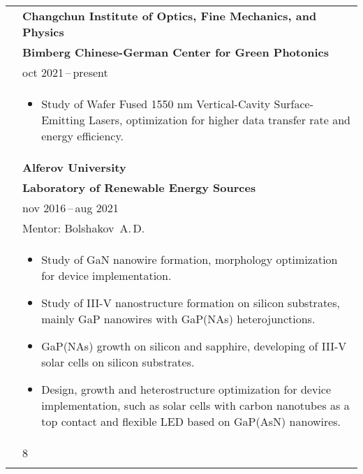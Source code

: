 \documentclass[letterpaper, 11pt]{article}
\begin{document}
\begin{longtable}{p{1.3in}p{4.8in}}
		
		\nohyphens{\color{OliveGreen}{Work experience}}
        & \textbf{Changchun Institute of Optics, Fine Mechanics, and Physics} \\
        & \textbf{Bimberg Chinese-German Center for Green Photonics} \\
		& \text{Postdoctoral researcher} \hfill oct 2021\,--\,present \\
        &
		\begin{itemize}
            \item Study of Wafer Fused 1550 nm Vertical-Cavity Surface-Emitting
                Lasers, optimization for higher data transfer rate and energy
                efficiency.
		\end{itemize} \\
		
        & \textbf{Alferov University} \\
        & \textbf{Laboratory of Renewable Energy Sources} \\
		& \text{Junior research assistant} \hfill nov 2016\,--\,aug 2021 \\
		& Mentor: Bolshakov~A.\,D. \\
        &
		\begin{itemize}
            \item Study of GaN nanowire formation, morphology optimization for
                device implementation.
            \item Study of III-V nanostructure formation on silicon substrates,
                mainly GaP nanowires with GaP(NAs) heterojunctions.
            \item GaP(NAs) growth on silicon and sapphire, developing of III-V
                solar cells on silicon substrates.
            \item Design, growth and heterostructure optimization for device
                implementation, such as solar cells with carbon nanotubes as a
                top contact and flexible LED based on GaP(AsN) nanowires.
		\end{itemize} \\

		\nohyphens{\color{OliveGreen}{h-index}}
        & 8 \\
		& \\
		
		
		

\end{longtable}
\end{document}
